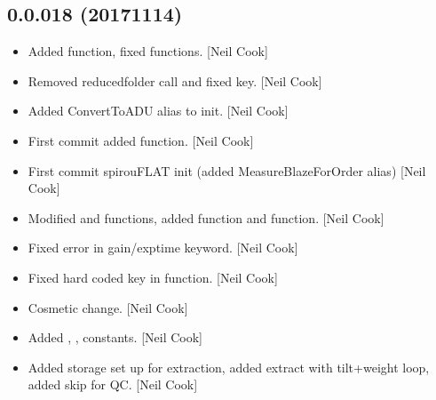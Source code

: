 \documentclass[a4paper,10pt,english]{report}
\begin{document}
\subsection{0.0.018 (2017\sphinxhyphen{}11\sphinxhyphen{}14)}
\label{\detokenize{misc/changelog:id552}}\begin{itemize}
\item {} 
Added  function, fixed 
functions. {[}Neil Cook{]}

\item {} 
Removed reducedfolder call and fixed  key. {[}Neil Cook{]}

\item {} 
Added ConvertToADU alias to init. {[}Neil Cook{]}

\item {} 
First commit  added  function.
{[}Neil Cook{]}

\item {} 
First commit spirouFLAT init (added MeasureBlazeForOrder alias) {[}Neil
Cook{]}

\item {} 
Modified  and  functions,
added  function and 
function. {[}Neil Cook{]}

\item {} 
Fixed error in gain/exptime keyword. {[}Neil Cook{]}

\item {} 
Fixed hard coded key in  function. {[}Neil Cook{]}

\item {} 
Cosmetic change. {[}Neil Cook{]}

\item {} 
Added , ,  constants. {[}Neil Cook{]}

\item {} 
Added storage set up for extraction, added extract with tilt+weight
loop, added skip for  QC. {[}Neil Cook{]}

\end{itemize}
\end{document}
